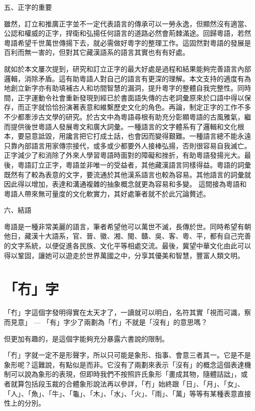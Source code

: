 \documentclass[a5paper, 10pt, openany]{book} %
\begin{document}
五、正字的重要

雖然，訂立和推廣正字並不一定代表語言的傳承可以一勞永逸，但顯然沒有適當、公認和權威的正字，捍衛和弘揚任何語言的道路必然會荊棘滿途。回歸粵語，若然粵語希望千世萬世傳揚下去，就必需做好粵字的整理工作。這固然對粵語的發展是百利而無一害的，但對其它藏漢語系的語言其實也有有好處。

就如於本文屢次提到，研究和訂立正字的最大好處是過程和結果能夠完善語言內部邏輯，消除矛盾。這有助粵語人對自己的語言有更深的理解。本文支持的適度有為地創立新字亦有助填補古人和坊間智慧的漏洞，提升粵字的整體自我完整性。同時間，正字運動令社會重新發現到經已於書面語失傳的古老詞彙原來於口語中得以保存，而正字就恰恰扮演著表意和維繫歷史文化的角色。再論，制定正字的工作不多不少都牽涉古文學的研究。於古文中為粵語尋根有助充分彰顯粵語的古風雅氣，繼而提供後世粵語人發展粵文和廣大詞彙。一種語言的文字體系有了邏輯和文化根本，要惡意詆毀，用讒言把它打成土話，也會因而變得艱難。一種語言總不能永遠只靠內部語言用家傳宗接代，或多或少都要外人接棒弘揚，否則很容易自我滅亡。正字減少了和消除了外來人學習粵語時面對的障礙和挫折，有助粵語發揚光大。最後，粵語訂立正字，粵語並非唯一的受益者，其他藏漢語言同樣得益。粵語的詞彙既然有了較為表意的文字，要流通於其他漢系語言也較為容易。其他語言的詞彙就因此得以增加，表達和溝通複雜的抽象概念就更為容易和多變。 這間接為粵語和粵語人帶來無可量度的文化軟實力，其好處筆者就不於此冗論贅述。

六、結語

粵語是一種非常美麗的語言，筆者希望他可以萬世不滅，長傳於世。同時希望有朝他日，藏漢十大語系，官、晉、徽、湘、閩、贛、吳、客、粵、平，都有自己完善的文字系統，以便促進各民族、文化平等相處交流。最後，冀望中華文化由此可以得以鞏固，讓她可以遊走於世界萬國之中，分享其優美和智慧，豐富人類文明。


\chapter{「冇」字}
「冇」字這個字發明得實在太天才了，一讀就可以明白，名符其實「視而可識，察而見意」 — 「有」字少了兩劃為「冇」不就是「沒有」的意思嗎？

但更加有趣的，是這個字能夠充分暴露六書說的限制。

「冇」字就一定不是形聲字，所以只可能是象形、指事、會意三者其一。它是不是象形呢？這難說，有點似是而非。它沒有了兩劃來表示「沒有」的概念這個表達機制可以說為象形的表現，但即時我們不按照許氏象形「畫成其物，隨體詰詘」，或者就算包括段玉裁的合體象形說法再以參詳，「冇」始終跟「日」、「月」、「女」、「人」、「魚」、「牛」、「龜」、「木」、「水」、「火」、「雨」、「萬」等等有某種表意直接性上的分別。
\end{document}
